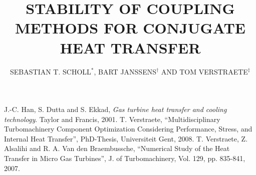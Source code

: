 \documentclass{coupled}
\title{STABILITY OF COUPLING METHODS FOR CONJUGATE HEAT TRANSFER}
\author{SEBASTIAN T. SCHOLL$^{*}$, BART JANSSENS$^{\dag}$ AND TOM VERSTRAETE$^{\ddag}$}
\begin{document}














\begin{thebibliography}{99}

 J.-C. Han, S. Dutta and S. Ekkad, \textit{Gas turbine heat transfer and cooling technology}. Taylor and Francis, 2001.
 T. Verstraete, “Multidisciplinary Turbomachinery Component Optimization Considering Performance, Stress, and Internal Heat Transfer”, PhD-Thesis, Universiteit Gent, 2008.
 T. Verstraete, Z. Alsalihi and R. A. Van den Braembussche, “Numerical Study of the Heat Transfer in Micro Gas Turbines”, J. of Turbomachinery, Vol. 129, pp. 835-841, 2007.


\end{thebibliography}
\end{document}
